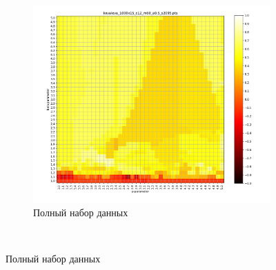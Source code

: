 \documentclass[12pt,twoside,a4paper,tikz,border=5]{refart}
\begin{document}
	\begin{figure}[t!]
		\centering
		\begin{subfigure}[t]{1\textwidth}
			\centering
			\includegraphics[width=1\linewidth, trim=1.4cm 1cm 2cm 0.5cm, clip]{img/sw/12/kovaleva_1000x15_c12_m60_a0.5_s2095/kovaleva_1000x15_c12_m60_a0.5_s2095.png}
			\caption{Полный набор данных}
			\label{fig:sw-1000}
		\end{subfigure}%
		~ 	
		

\end{figure}
\end{document}
